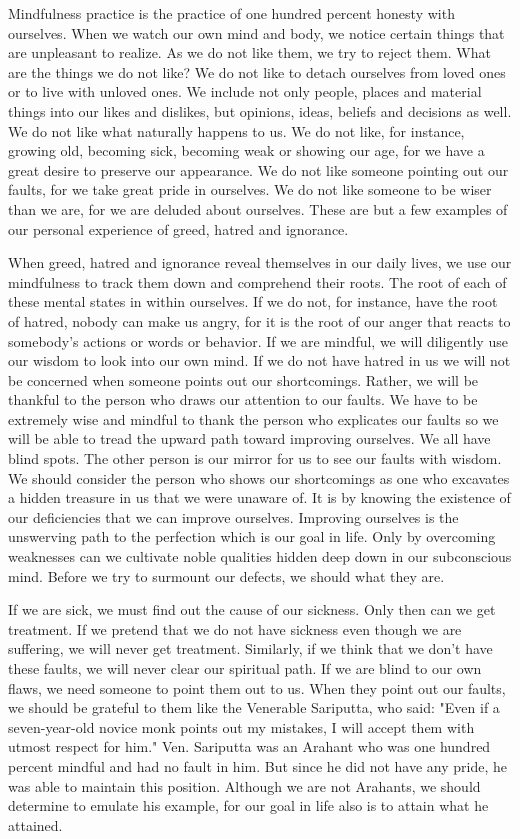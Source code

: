 Mindfulness practice is the practice of one hundred percent honesty with
ourselves. When we watch our own mind and body, we notice certain things that
are unpleasant to realize. As we do not like them, we try to reject them. What
are the things we do not like? We do not like to detach ourselves from loved
ones or to live with unloved ones. We include not only people, places and
material things into our likes and dislikes, but opinions, ideas, beliefs and
decisions as well. We do not like what naturally happens to us. We do not like,
for instance, growing old, becoming sick, becoming weak or showing our age, for
we have a great desire to preserve our appearance. We do not like someone
pointing out our faults, for we take great pride in ourselves. We do not like
someone to be wiser than we are, for we are deluded about ourselves. These are
but a few examples of our personal experience of greed, hatred and ignorance.

When greed, hatred and ignorance reveal themselves in our daily lives, we use
our mindfulness to track them down and comprehend their roots. The root of each
of these mental states in within ourselves. If we do not, for instance, have the
root of hatred, nobody can make us angry, for it is the root of our anger that
reacts to somebody's actions or words or behavior. If we are mindful, we will
diligently use our wisdom to look into our own mind. If we do not have hatred in
us we will not be concerned when someone points out our shortcomings. Rather, we
will be thankful to the person who draws our attention to our faults. We have to
be extremely wise and mindful to thank the person who explicates our faults so
we will be able to tread the upward path toward improving ourselves. We all have
blind spots. The other person is our mirror for us to see our faults with
wisdom. We should consider the person who shows our shortcomings as one who
excavates a hidden treasure in us that we were unaware of. It is by knowing the
existence of our deficiencies that we can improve ourselves. Improving ourselves
is the unswerving path to the perfection which is our goal in life. Only by
overcoming weaknesses can we cultivate noble qualities hidden deep down in our
subconscious mind. Before we try to surmount our defects, we should what they
are.

If we are sick, we must find out the cause of our sickness. Only then can we get
treatment. If we pretend that we do not have sickness even though we are
suffering, we will never get treatment. Similarly, if we think that we don't
have these faults, we will never clear our spiritual path. If we are blind to
our own flaws, we need someone to point them out to us. When they point out our
faults, we should be grateful to them like the Venerable Sariputta, who said:
"Even if a seven-year-old novice monk points out my mistakes, I will accept them
with utmost respect for him." Ven. Sariputta was an Arahant who was one hundred
percent mindful and had no fault in him. But since he did not have any pride, he
was able to maintain this position. Although we are not Arahants, we should
determine to emulate his example, for our goal in life also is to attain what he
attained.

